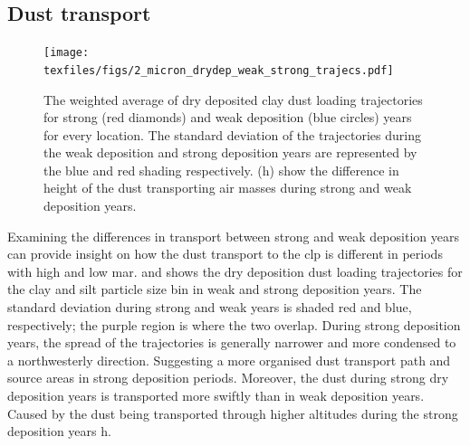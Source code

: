 \subsection{Dust transport}
\begin{figure}[htbp]
    \centering
    \texttt{[image: texfiles/figs/2\_micron\_drydep\_weak\_strong\_trajecs.pdf]}
    \caption{The weighted average of dry deposited clay dust loading trajectories for strong (red diamonds) and weak deposition (blue circles) years for every location. The standard deviation of the trajectories during the weak deposition and strong deposition years are represented by the blue and red shading respectively.  (h) show the difference in height of the dust transporting air masses during strong and weak deposition years. }
    \label{fig:strong_weak_drydepo_year_2mmu_trajecs}
\end{figure}

Examining the differences in transport between strong and weak deposition years can provide insight on how the dust transport to the \acrshort{clp} is different in periods with high and low \acrshort{mar}. 
 and  shows the dry deposition dust loading trajectories for the clay and silt particle size bin in weak and strong deposition years. 
The standard deviation during strong and weak years is shaded red and blue, respectively; the purple region is where the two overlap. 
During strong deposition years, the spread of the trajectories is generally narrower and more condensed to a northwesterly direction.
Suggesting a more organised dust transport path and source areas in strong deposition periods.   
Moreover, the dust during strong dry deposition years is transported more swiftly than in weak deposition years. 
Caused by the dust being transported through higher altitudes during the strong deposition years h.


